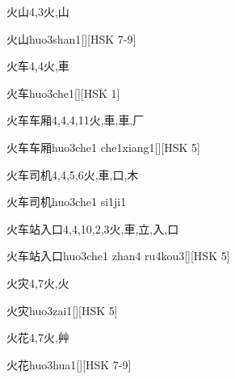 \begin{Entry}{火山}{4,3}{⽕,⼭}
  \begin{Phonetics}{火山}{huo3shan1}[][HSK 7-9]
  \end{Phonetics}
\end{Entry}

\begin{Entry}{火车}{4,4}{⽕,⾞}
  \begin{Phonetics}{火车}{huo3che1}[][HSK 1]
  \end{Phonetics}
\end{Entry}

\begin{Entry}{火车车厢}{4,4,4,11}{⽕,⾞,⾞,⼚}
  \begin{Phonetics}{火车车厢}{huo3che1 che1xiang1}[][HSK 5]
  \end{Phonetics}
\end{Entry}

\begin{Entry}{火车司机}{4,4,5,6}{⽕,⾞,⼝,⽊}
  \begin{Phonetics}{火车司机}{huo3che1 si1ji1}
  \end{Phonetics}
\end{Entry}

\begin{Entry}{火车站入口}{4,4,10,2,3}{⽕,⾞,⽴,⼊,⼝}
  \begin{Phonetics}{火车站入口}{huo3che1 zhan4 ru4kou3}[][HSK 5]
  \end{Phonetics}
\end{Entry}

\begin{Entry}{火灾}{4,7}{⽕,⽕}
  \begin{Phonetics}{火灾}{huo3zai1}[][HSK 5]
  \end{Phonetics}
\end{Entry}

\begin{Entry}{火花}{4,7}{⽕,⾋}
  \begin{Phonetics}{火花}{huo3hua1}[][HSK 7-9]
  \end{Phonetics}
\end{Entry}

